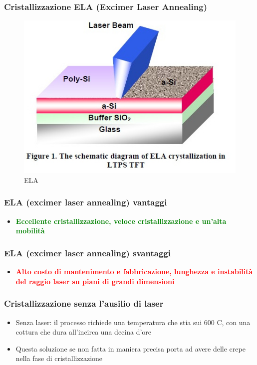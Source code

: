 \documentclass[12pt]{beamer}
\begin{document}
	\begin{frame}
		\frametitle{Cristallizzazione ELA (Excimer Laser Annealing)}
			\begin{figure}
				\centering
				\includegraphics[width=1\linewidth]{"FISICA/ELA cristallizzazione"}
				\caption{ELA}
				\label{fig:ela-cristallizzazione}
			\end{figure}
	\end{frame}
	\begin{frame}
		\frametitle{ELA (excimer laser annealing) vantaggi}
		\begin{itemize}
			\item \textbf{\textcolor{green}{Eccellente cristallizzazione, veloce cristallizzazione e un'alta mobilità}}
		\end{itemize}
	\end{frame}
	\begin{frame}
		\frametitle{ELA (excimer laser annealing) svantaggi}
		\begin{itemize}
			\item \textbf{\textcolor{red}{Alto costo di mantenimento e fabbricazione, lunghezza e instabilità del raggio laser su piani di grandi dimensioni}}
		\end{itemize}
	\end{frame}
	\begin{frame}
		\frametitle{Cristallizzazione senza l'ausilio di laser}
		\begin{itemize}
			\item Senza laser: il processo richiede una temperatura che stia sui 600 \degree C, con una cottura che dura all'incirca una decina d'ore
			\pause
			\item Questa soluzione se non fatta in maniera precisa porta ad avere delle crepe nella fase di cristallizzazione
		\end{itemize}
	\end{frame}
\end{document}
